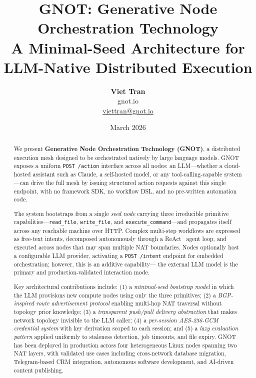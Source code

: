\documentclass[10pt,twocolumn]{article}
\begin{document}
\title{%
  \textbf{GNOT: Generative Node Orchestration Technology}\\[4pt]
  \large A Minimal-Seed Architecture for LLM-Native Distributed Execution
}

\author{%
  \textbf{Viet Tran} \\
  \small gnot.io \\
  \small \href{mailto:viettran@gnot.io}{viettran@gnot.io}
}

\date{March 2026}

\maketitle
\thispagestyle{fancy}

\begin{abstract}
We present \textbf{Generative Node Orchestration Technology (GNOT)}, a
distributed execution mesh designed to be orchestrated natively by large
language models. GNOT exposes a uniform \texttt{POST /action} interface
across all nodes: an LLM---whether a cloud-hosted assistant such as
Claude, a self-hosted model, or any tool-calling-capable system---can
drive the full mesh by issuing structured action requests against this
single endpoint, with no framework SDK, no workflow DSL, and no
pre-written automation code.

The system bootstraps from a single \emph{seed node} carrying three
irreducible primitive capabilities---\texttt{read\_file},
\texttt{write\_file}, and \texttt{execute\_command}---and propagates
itself across any reachable machine over HTTP. Complex multi-step
workflows are expressed as free-text intents, decomposed autonomously
through a ReAct~\cite{react2022} agent loop, and executed across nodes
that may span multiple NAT boundaries. Nodes optionally host a
configurable LLM provider, activating a \texttt{POST /intent} endpoint
for embedded orchestration; however, this is an additive capability---
the external LLM model is the primary and production-validated
interaction mode.

Key architectural contributions include: (1) a \emph{minimal-seed
bootstrap model} in which the LLM provisions new compute nodes using
only the three primitives; (2) a \emph{BGP-inspired route advertisement
protocol} enabling multi-hop NAT traversal without topology prior
knowledge; (3) a \emph{transparent push/pull delivery abstraction}
that makes network topology invisible to the LLM caller; (4) a
\emph{per-session AES-256-GCM credential system} with key derivation
scoped to each session; and (5) a \emph{lazy evaluation pattern}
applied uniformly to staleness detection, job timeouts, and file expiry.
GNOT has been deployed in production across four heterogeneous Linux
nodes spanning two NAT layers, with validated use cases including
cross-network database migration, Telegram-based CRM integration,
autonomous software development, and AI-driven content publishing.
\end{abstract}
\end{document}
